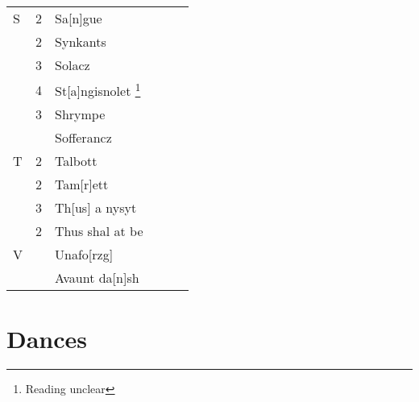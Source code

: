 \documentclass[12pt,letter]{article} %
\begin{document}
\begin{center}
\begin{tabular}{lcl clr}
S & 2 & Sa[n]gue  & & & \\
  & 2 & Synkants & & & \\
  & 3 & Solacz & & & \\
  & 4 & St[a]ngisnolet \footnote{Reading unclear} & & & \\
  & 3 & Shrympe & & & \\
  &   & Sofferancz & & & \\
T & 2 & Talbott & & & \\
  & 2 & Tam[r]ett & & & \\
  & 3 & Th[us] a nysyt & & & \\
  & 2 & Thus shal at be & & & \\
V &   & Unafo[rzg]  & & & \\
  &   & Avaunt da[n]sh & & & \\
\end{tabular}
\end{center}


\newpage 
    \section{Dances}
    \textwidth=3.5in
    \marginparwidth=2in
    \oddsidemargin=2in

    \reversemarginpar
\end{document}

